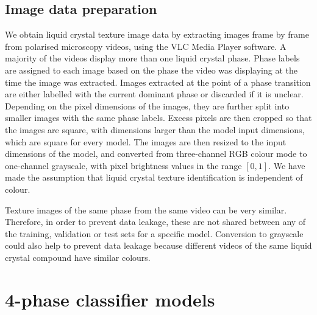 \documentclass[12pt]{article}
\begin{document}
\subsection{Image data preparation}
We obtain liquid crystal texture image data by extracting images frame by frame from polarised microscopy videos, using the VLC Media Player software. A majority of the videos display more than one liquid crystal phase. Phase labels are assigned to each image based on the phase the video was displaying at the time the image was extracted. Images extracted at the point of a phase transition are either labelled with the current dominant phase or discarded if it is unclear. Depending on the pixel dimensions of the images, they are further split into smaller images with the same phase labels. Excess pixels are then cropped so that the images are square, with dimensions larger than the model input dimensions, which are square for every model. The images are then resized to the input dimensions of the model, and converted from three-channel RGB colour mode to one-channel grayscale, with pixel brightness values in the range $[0,1]$. We have made the assumption that liquid crystal texture identification is independent of colour.

Texture images of the same phase from the same video can be very similar. Therefore, in order to prevent data leakage, these are not shared between any of the training, validation or test sets for a specific model. Conversion to grayscale could also help to prevent data leakage because different videos of the same liquid crystal compound have similar colours.
\section{4-phase classifier models}
\end{document}
